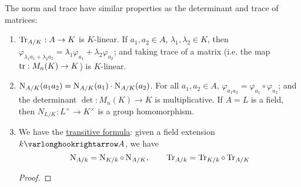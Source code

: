 \documentclass{article}
\begin{document}
\begin{remark}\label{rmk: props of norm and trace maps}
    The norm and trace have similar properties as the determinant and trace of matrices:
    \begin{enumerate}[label=\arabic*)]
        \item $\operatorname{Tr}_{A/K}: A \to K$ is $K$-linear. If $a_1, a_2 \in A$, $\lambda_1, \lambda_2 \in K$, then $\varphi_{\lambda_1 a_1 + \lambda_2 a_2} = \lambda_1 \varphi_{a_1} + \lambda_2 \varphi_{a_2}$; and taking trace of a matrix (i.e. the map $\operatorname{tr}: M_n(K) \to K$) is $K$-linear.
        \item $\operatorname{N}_{A/K}(a_1 a_2) = \operatorname{N}_{A/K}(a_1) \cdot \operatorname{N}_{A/K}(a_2)$. For all $a_1, a_2 \in A$, $\varphi_{a_1 a_2} = \varphi_{a_1} \circ \varphi_{a_2}$; and the determinant $\det: M_n(K) \to K$ is multiplicative. If $A = L$ is a field, then $N_{L/K}: L^{\times} \to K^{\times}$ is a group homomorphism.
        \item We have the \underline{transitive formula}: given a field extension $k \ext A$, we have
        \[
            \operatorname{N}_{A/k} = \operatorname{N}_{K/k} \circ \operatorname{N}_{A/K}, \qquad \operatorname{Tr}_{A/k} = \operatorname{Tr}_{K/k} \circ \operatorname{Tr}_{A/K}
        \]
        \begin{proof}
            

\end{proof}
\end{enumerate}
\end{remark}
\end{document}
